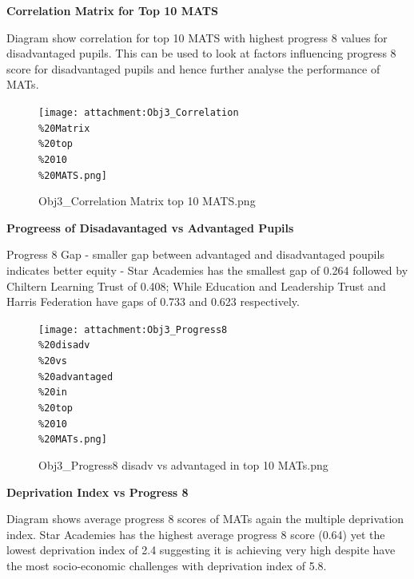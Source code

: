 \documentclass[
  letterpaper,
  DIV=11,
  numbers=noendperiod]{scrartcl}
\begin{document}
\textbf{Correlation Matrix for Top 10 MATS}

Diagram show correlation for top 10 MATS with highest progress 8 values
for disadvantaged pupils. This can be used to look at factors
influencing progress 8 score for disadvantaged pupils and hence further
analyse the performance of MATs.

\begin{figure}[H]

{\centering \texttt{[image: attachment:Obj3\_Correlation\\\%20Matrix\\\%20top\\\%2010\\\%20MATS.png]}

}

\caption{Obj3\_Correlation Matrix top 10 MATS.png}

\end{figure}%

\textbf{Progreess of Disadavantaged vs Advantaged Pupils}

Progress 8 Gap - smaller gap between advantaged and disadvantaged
poupils indicates better equity - Star Academies has the smallest gap of
0.264 followed by Chiltern Learning Trust of 0.408; While Education and
Leadership Trust and Harris Federation have gaps of 0.733 and 0.623
respectively.

\begin{figure}[H]

{\centering \texttt{[image: attachment:Obj3\_Progress8\\\%20disadv\\\%20vs\\\%20advantaged\\\%20in\\\%20top\\\%2010\\\%20MATs.png]}

}

\caption{Obj3\_Progress8 disadv vs advantaged in top 10 MATs.png}

\end{figure}%

\textbf{Deprivation Index vs Progress 8}

Diagram shows average progress 8 scores of MATs again the multiple
deprivation index. Star Academies has the highest average progress 8
score (0.64) yet the lowest deprivation index of 2.4 suggesting it is
achieving very high despite have the most socio-economic challenges with
deprivation index of 5.8.
\end{document}
